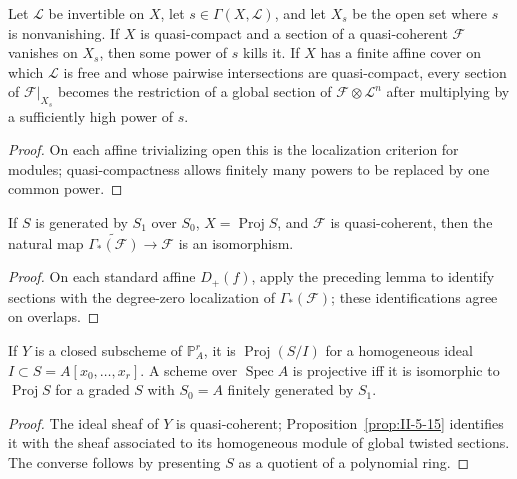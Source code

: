 \begin{lemma}
\label{lem:II-5-14}
Let $\mathcal L$ be invertible on $X$, let $s\in\Gamma(X,\mathcal L)$, and let $X_s$ be the
open set where $s$ is nonvanishing. If $X$ is quasi-compact and a section of a quasi-coherent
$\mathcal F$ vanishes on $X_s$, then some power of $s$ kills it. If $X$ has a finite affine cover
on which $\mathcal L$ is free and whose pairwise intersections are quasi-compact, every section
of $\mathcal F|_{X_s}$ becomes the restriction of a global section of $\mathcal F\otimes\mathcal L^n$
after multiplying by a sufficiently high power of $s$.
\end{lemma}
\begin{proof}
On each affine trivializing open this is the localization criterion for modules; quasi-compactness
allows finitely many powers to be replaced by one common power.
\end{proof}

\begin{proposition}
\label{prop:II-5-15}
If $S$ is generated by $S_1$ over $S_0$, $X=\operatorname{Proj}S$, and $\mathcal F$ is
quasi-coherent, then the natural map $\widetilde{\Gamma_*(\mathcal F)}\to\mathcal F$ is an isomorphism.
\end{proposition}
\begin{proof}
On each standard affine $D_+(f)$, apply the preceding lemma to identify sections with the degree-zero
localization of $\Gamma_*(\mathcal F)$; these identifications agree on overlaps.
\end{proof}

\begin{corollary}
\label{cor:II-5-16}
If $Y$ is a closed subscheme of $\mathbb P^r_A$, it is $\operatorname{Proj}(S/I)$ for a homogeneous
ideal $I\subset S=A[x_0,\ldots,x_r]$. A scheme over $\operatorname{Spec}A$ is projective iff it is
isomorphic to $\operatorname{Proj}S$ for a graded $S$ with $S_0=A$ finitely generated by $S_1$.
\end{corollary}
\begin{proof}
The ideal sheaf of $Y$ is quasi-coherent; Proposition~\ref{prop:II-5-15} identifies it with the
sheaf associated to its homogeneous module of global twisted sections. The converse follows by
presenting $S$ as a quotient of a polynomial ring.
\end{proof}

